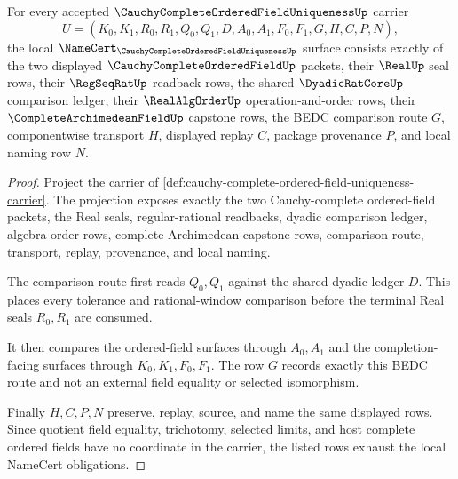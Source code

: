 \begin{theorem}
\label{thm:cauchy-complete-ordered-field-uniqueness-namecert-obligations}
For every accepted $\CauchyCompleteOrderedFieldUniquenessUp$ carrier
$$
U=(K_0,K_1,R_0,R_1,Q_0,Q_1,D,A_0,A_1,F_0,F_1,G,H,C,P,N),
$$
the local $\NameCert_{\CauchyCompleteOrderedFieldUniquenessUp}$ surface consists exactly of the two displayed $\CauchyCompleteOrderedFieldUp$ packets, their $\RealUp$ seal rows, their $\RegSeqRatUp$ readback rows, the shared $\DyadicRatCoreUp$ comparison ledger, their $\RealAlgOrderUp$ operation-and-order rows, their $\CompleteArchimedeanFieldUp$ capstone rows, the BEDC comparison route $G$, componentwise transport $H$, displayed replay $C$, package provenance $P$, and local naming row $N$.
\end{theorem}
\begin{proof}
Project the carrier of \autoref{def:cauchy-complete-ordered-field-uniqueness-carrier}. The projection exposes exactly the two Cauchy-complete ordered-field packets, the Real seals, regular-rational readbacks, dyadic comparison ledger, algebra-order rows, complete Archimedean capstone rows, comparison route, transport, replay, provenance, and local naming.

The comparison route first reads $Q_0,Q_1$ against the shared dyadic ledger $D$. This places every tolerance and rational-window comparison before the terminal Real seals $R_0,R_1$ are consumed.

It then compares the ordered-field surfaces through $A_0,A_1$ and the completion-facing surfaces through $K_0,K_1,F_0,F_1$. The row $G$ records exactly this BEDC route and not an external field equality or selected isomorphism.

Finally $H,C,P,N$ preserve, replay, source, and name the same displayed rows. Since quotient field equality, trichotomy, selected limits, and host complete ordered fields have no coordinate in the carrier, the listed rows exhaust the local NameCert obligations.
\end{proof}

